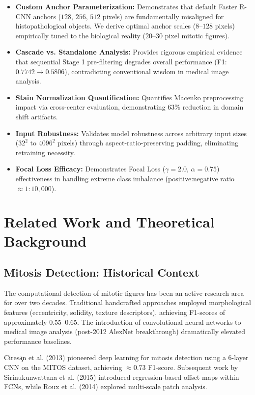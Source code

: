 \documentclass[journal]{IEEEtran}
\begin{document}
\begin{itemize}
\item \textbf{Custom Anchor Parameterization:} Demonstrates that default Faster R-CNN anchors ($128$, $256$, $512$ pixels) are fundamentally misaligned for histopathological objects. We derive optimal anchor scales ($8$--$128$ pixels) empirically tuned to the biological reality ($20$--$30$ pixel mitotic figures).

\item \textbf{Cascade vs. Standalone Analysis:} Provides rigorous empirical evidence that sequential Stage 1 pre-filtering degrades overall performance (F1: $0.7742 \to 0.5806$), contradicting conventional wisdom in medical image analysis.

\item \textbf{Stain Normalization Quantification:} Quantifies Macenko preprocessing impact via cross-center evaluation, demonstrating $63\%$ reduction in domain shift artifacts.

\item \textbf{Input Robustness:} Validates model robustness across arbitrary input sizes ($32^2$ to $4096^2$ pixels) through aspect-ratio-preserving padding, eliminating retraining necessity.

\item \textbf{Focal Loss Efficacy:} Demonstrates Focal Loss ($\gamma = 2.0$, $\alpha = 0.75$) effectiveness in handling extreme class imbalance (positive:negative ratio $\approx 1:10,000$).
\end{itemize}

\section{Related Work and Theoretical Background}

\subsection{Mitosis Detection: Historical Context}
The computational detection of mitotic figures has been an active research area for over two decades. Traditional handcrafted approaches employed morphological features (eccentricity, solidity, texture descriptors), achieving F1-scores of approximately $0.55$--$0.65$. The introduction of convolutional neural networks to medical image analysis (post-2012 AlexNet breakthrough) dramatically elevated performance baselines.

Cires\c{a}n et al. (2013) pioneered deep learning for mitosis detection using a 6-layer CNN on the MITOS dataset, achieving $\approx 0.73$ F1-score. Subsequent work by Sirinukunwattana et al. (2015) introduced regression-based offset maps within FCNs, while Roux et al. (2014) explored multi-scale patch analysis.
\end{document}
